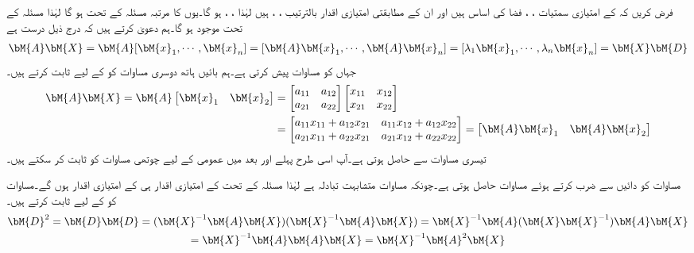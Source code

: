 
فرض کریں کہ  کے امتیازی سمتیات ،  ، فضا  کی اساس ہیں اور ان کے مطابقتی امتیازی اقدار بالترتیب ، ، ہیں لہٰذا ، ، ہو گا۔یوں  کا مرتبہ مسئلہ  کے تحت  ہو گا لہٰذا مسئلہ  کے تحت   موجود ہو گا۔ہم دعویٰ کرتے ہیں کہ درج ذیل درست ہے
\begin{align}\label{مساوات_امتیازی_وتری_حصول_پ}
\bM{A}\bM{X}=\bM{A}[\bM{x}_1,\cdots,\bM{x}_n]=[\bM{A}\bM{x}_1,\cdots,\bM{A}\bM{x}_n]=[\lambda_1\bM{x}_1,\cdots,\lambda_n\bM{x}_n]=\bM{X}\bM{D}
\end{align}
جہاں  کو مساوات  پیش کرتی ہے۔ہم بائیں ہاتھ دوسری مساوات کو  کے لیے ثابت کرتے ہیں۔
\begin{align*}
\bM{A}\bM{X}=\bM{A}\begin{bmatrix}\bM{x}_1\quad \bM{x}_2\end{bmatrix}&=\begin{bmatrix}a_{11}\quad a_{12}\\a_{21}\quad a_{22}  \end{bmatrix}\begin{bmatrix}x_{11}\quad x_{12}\\x_{21}\quad x_{22}  \end{bmatrix}\\
&=\begin{bmatrix} a_{11}x_{11}+a_{12}x_{21}\quad a_{11}x_{12}+a_{12}x_{22} \\ a_{21}x_{11}+a_{22}x_{21}\quad a_{21}x_{12}+a_{22}x_{22}\end{bmatrix}=\begin{bmatrix} \bM{A}\bM{x}_1\quad \bM{A}\bM{x}_2 \end{bmatrix}
\end{align*}
تیسری مساوات  سے حاصل ہوتی ہے۔آپ اسی طرح پہلے  اور بعد میں عمومی  کے لیے چوتھی مساوات کو ثابت کر سکتے ہیں۔

مساوات  کو دائیں  سے ضرب کرتے ہوئے مساوات  حاصل ہوتی ہے۔چونکہ مساوات  متشابہت تبادلہ ہے  لہٰذا مسئلہ  کے تحت  کے امتیازی اقدار ہی  کے امتیازی اقدار  ہوں گے۔مساوات  کو  کے لیے ثابت کرتے ہیں۔
\begin{multline*}
\bM{D}^2=\bM{D}\bM{D}=(\bM{X}^{-1}\bM{A}\bM{X})(\bM{X}^{-1}\bM{A}\bM{X})=\bM{X}^{-1}\bM{A}(\bM{X}\bM{X}^{-1})\bM{A}\bM{X}\\
=\bM{X}^{-1}\bM{A}\bM{A}\bM{X}=\bM{X}^{-1}\bM{A}^2\bM{X}
\end{multline*}


